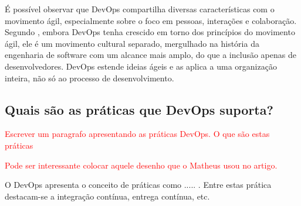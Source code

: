 \documentclass[twoside,english,brazilian]{UNISINOSartigo}
\begin{document}
É possível observar que DevOps compartilha diversas características com o movimento ágil, especialmente sobre o foco em pessoas, interações e colaboração. Segundo \citep{Fallis2013}, embora DevOps tenha crescido em torno dos princípios do movimento ágil, ele é um movimento cultural separado, mergulhado na história da engenharia de software com um alcance mais amplo, do que a inclusão apenas de desenvolvedores. DevOps estende ideias ágeis e as aplica a uma organização inteira, não só ao processo de desenvolvimento.  
\subsection{Quais são as práticas que DevOps suporta? }

\textcolor{red}{Escrever um paragrafo apresentando as práticas DevOps. O que são estas práticas}

\textcolor{red}{Pode ser interessante colocar aquele desenho que o Matheus usou no artigo.}

O DevOps apresenta o conceito de práticas como ..... . Entre estas prática destacam-se a integração contínua, entrega contínua, etc.
\end{document}
